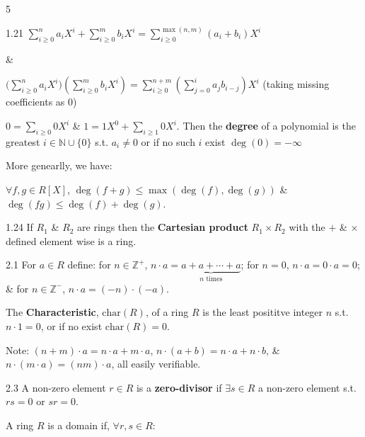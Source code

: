 \documentclass[8pt]{extarticle}
\newcommand{\fitdisplay}[1]{%
  \par\vspace{-1pt}\noindent
  \sbox{\fitdisplaybox}{#1}%
  \makebox[\columnwidth][c]{%
    \ifdim\wd\fitdisplaybox>\columnwidth
      \resizebox{\columnwidth}{!}{#1}%
    \else
      \usebox{\fitdisplaybox}%
    \fi
  }%
  \par\vspace{-1pt}%
}
\begin{document}
\begin{multicols*}{5}
\begin{definition}{1.21}
            \(\sum_{i\ge0}^na_iX^i+\sum_{i\ge0}^mb_iX^i=\sum_{i\ge0}^{\max(n,m)}(a_i+b_i)X^i\)
            
            \&
            
            \(\big(\sum\limits_{i\ge0}^na_iX^i)(\sum\limits_{i\ge0}^mb_iX^i)=\sum\limits_{i\ge0}^{n+m}(\sum\limits_{j=0}^ia_{j}b_{i-j})X^i\)
            {\footnotesize (taking missing coefficients as 0)}
            
            \(0=\sum_{i\ge0}0X^i\) \& \(1=1X^0+\sum_{i\ge1}0X^i\). Then the \textbf{degree} of a polynomial is the greatest \(i\in\mathbb{N}\cup\{0\}\) s.t. \(a_i\ne0\) or if no such \(i\) exist \(\deg(0)=-\infty\)

            More genearlly, we have:
            
            \fitdisplay{\(R[X_1,\ldots,X_n]=R[X_1,\ldots,X_{n-1}][X_n]\)}

            {\footnotesize \(\forall f,g\in R[X]\), \(\deg(f+g)\le\max(\deg(f),\deg(g))\)} \& \(\deg(fg)\le\deg(f)+\deg(g)\).
        \end{definition}

        \begin{definition}{1.24}
            If \(R_1\) \& \(R_2\) are rings then the \textbf{Cartesian product} \(R_1\times R_2\) with the \(+\) \& \(\times\) defined element wise is a ring.
        \end{definition}

        \begin{definition}{2.1}
            For \(a\in R\) define: for \(n\in\mathbb{Z}^+\), \(n\cdot a=\underbrace{a+a+\cdots+a}_{n\text{ times}}\); for \(n=0\), \(n\cdot a=0\cdot a=0\); \& for \(n\in\mathbb{Z}^-\), \(n\cdot a=(-n)\cdot(-a)\).
            
            The \textbf{Characteristic}, \(\text{char}(R)\), of a ring \(R\) is the least posititve integer \(n\) s.t. \(n\cdot 1=0\), or if no exist \(\text{char}(R)=0\).
            
            {\footnotesize Note: \((n+m)\cdot a=n\cdot a+m\cdot a\), \(n\cdot(a+b)=n\cdot a+n\cdot b\), \& \(n\cdot(m\cdot a)=(nm)\cdot a\), all easily verifiable.}
        \end{definition}

        \begin{definition}{2.3}
            A non-zero element \(r\in R\) is a \textbf{zero-divisor} if \(\exists s\in R\) a non-zero element s.t. \(rs=0\) or \(sr=0\).

            A ring \(R\) is a domain if, \(\forall r,s\in R\):


\end{definition}
\end{multicols*}
\end{document}
